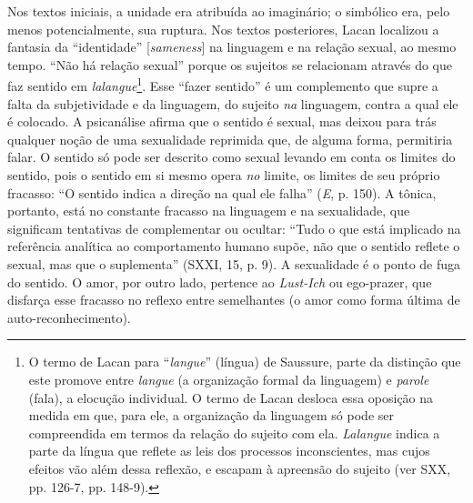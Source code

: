 Nos textos iniciais, a unidade era atribuída ao imaginário; o simbólico
era, pelo menos potencialmente, sua ruptura. Nos textos posteriores,
Lacan localizou a fantasia da ``identidade'' {[}\emph{sameness}{]} na
linguagem e na relação sexual, ao mesmo tempo. ``Não há relação sexual''
porque os sujeitos se relacionam através do que faz sentido em
\emph{lalangue}\footnote{O termo de Lacan para ``\emph{langue}''
  (língua) de Saussure, parte da distinção que este promove entre
  \emph{langue} (a organização formal da linguagem) e \emph{parole}
  (fala), a elocução individual. O termo de Lacan desloca essa oposição
  na medida em que, para ele, a organização da linguagem só pode ser
  compreendida em termos da relação do sujeito com ela. \emph{Lalangue}
  indica a parte da língua que reflete as leis dos processos
  inconscientes, mas cujos efeitos vão além dessa reflexão, e escapam à
  apreensão do sujeito (ver SXX, pp. 126-7, pp. 148-9).}. Esse ``fazer
sentido'' é um complemento que supre a falta da subjetividade e da
linguagem, do sujeito \emph{na} linguagem, contra a qual ele é colocado.
A psicanálise afirma que o sentido é sexual, mas deixou para trás
qualquer noção de uma sexualidade reprimida que, de alguma forma,
permitiria falar. O sentido só pode ser descrito como sexual levando em
conta os limites do sentido, pois o sentido em si mesmo opera \emph{no}
limite, os limites de seu próprio fracasso: ``O sentido indica a direção
na qual ele falha'' (\emph{E}, p. 150). A tônica, portanto, está no
constante fracasso na linguagem e na sexualidade, que significam
tentativas de complementar ou ocultar: ``Tudo o que está implicado na
referência analítica ao comportamento humano supõe, não que o sentido
reflete o sexual, mas que o suplementa'' (SXXI, 15, p. 9). A sexualidade
é o ponto de fuga do sentido. O amor, por outro lado, pertence ao
\emph{Lust-Ich} ou ego-prazer, que disfarça esse fracasso no reflexo
entre semelhantes (o amor como forma última de auto-reconhecimento).

